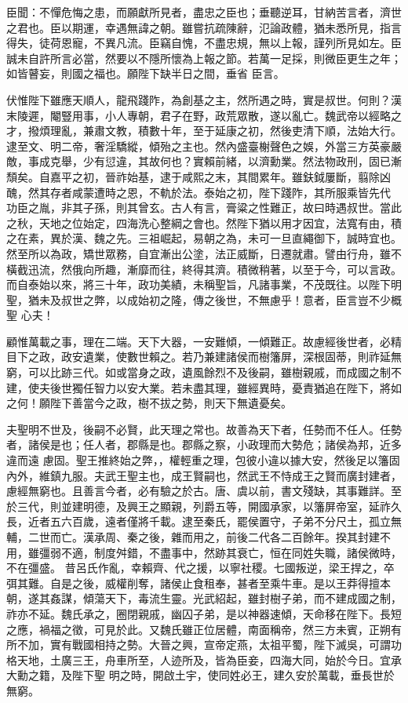 \begin{pinyinscope}
 臣聞：不憚危悔之患，而願獻所見者，盡忠之臣也；垂聽逆耳，甘納苦言者，濟世之君也。臣以期運，幸遇無諱之朝。雖嘗抗疏陳辭，氾論政體，猶未悉所見，指言得失，徒荷恩寵，不異凡流。臣竊自愧，不盡忠規，無以上報，謹列所見如左。臣誠未自許所言必當，然要以不隱所懷為上報之節。若萬一足採，則微臣更生之年；如皆瞽妄，則國之福也。願陛下缺半日之間，垂省
 臣言。



 伏惟陛下雖應天順人，龍飛踐阼，為創基之主，然所遇之時，實是叔世。何則？漢末陵遲，閹豎用事，小人專朝，君子在野，政荒眾散，遂以亂亡。魏武帝以經略之才，撥煩理亂，兼肅文教，積數十年，至于延康之初，然後吏清下順，法始大行。逮至文、明二帝，奢淫驕縱，傾殆之主也。然內盛臺榭聲色之娛，外當三方英豪嚴敵，事成克舉，少有愆違，其故何也？實賴前緒，以濟勳業。然法物政刑，固已漸頹矣。自嘉平之初，晉祚始基，逮于咸熙之末，其間累年。雖鈇鉞屢斷，翦除凶醜，然其存者咸蒙遭時之恩，不軌於法。泰始之初，陛下踐阼，其所服乘皆先代
 功臣之胤，非其子孫，則其曾玄。古人有言，膏粱之性難正，故曰時遇叔世。當此之秋，天地之位始定，四海洗心整綱之會也。然陛下猶以用才因宜，法寬有由，積之在素，異於漢、魏之先。三祖崛起，易朝之為，未可一旦直繩御下，誠時宜也。然至所以為政，矯世眾務，自宜漸出公塗，法正威斷，日遷就肅。譬由行舟，雖不橫截迅流，然俄向所趣，漸靡而往，終得其濟。積微稍著，以至于今，可以言政。而自泰始以來，將三十年，政功美績，未稱聖旨，凡諸事業，不茂既往。以陛下明聖，猶未及叔世之弊，以成始初之隆，傳之後世，不無慮乎！意者，臣言豈不少概聖
 心夫！



 顧惟萬載之事，理在二端。天下大器，一安難傾，一傾難正。故慮經後世者，必精目下之政，政安遺業，使數世賴之。若乃兼建諸侯而樹籓屏，深根固蒂，則祚延無窮，可以比跡三代。如或當身之政，遺風餘烈不及後嗣，雖樹親戚，而成國之制不建，使夫後世獨任智力以安大業。若未盡其理，雖經異時，憂責猶追在陛下，將如之何！願陛下善當今之政，樹不拔之勢，則天下無遺憂矣。



 夫聖明不世及，後嗣不必賢，此天理之常也。故善為天下者，任勢而不任人。任勢者，諸侯是也；任人者，郡縣是也。郡縣之察，小政理而大勢危；諸侯為邦，近多違而遠
 慮固。聖王推終始之弊，，權輕重之理，包彼小違以據大安，然後足以籓固內外，維鎮九服。夫武王聖主也，成王賢嗣也，然武王不恃成王之賢而廣封建者，慮經無窮也。且善言今者，必有驗之於古。唐、虞以前，書文殘缺，其事難詳。至於三代，則並建明德，及興王之顯親，列爵五等，開國承家，以籓屏帝室，延祚久長，近者五六百歲，遠者僅將千載。逮至秦氏，罷侯置守，子弟不分尺土，孤立無輔，二世而亡。漢承周、秦之後，雜而用之，前後二代各二百餘年。揆其封建不用，雖彊弱不適，制度舛錯，不盡事中，然跡其衰亡，恒在同姓失職，諸侯微時，不在彊盛。
 昔呂氏作亂，幸賴齊、代之援，以寧社稷。七國叛逆，梁王捍之，卒弭其難。自是之後，威權削奪，諸侯止食租奉，甚者至乘牛車。是以王莽得擅本朝，遂其姦謀，傾蕩天下，毒流生靈。光武紹起，雖封樹子弟，而不建成國之制，祚亦不延。魏氏承之，圈閉親戚，幽囚子弟，是以神器速傾，天命移在陛下。長短之應，禍福之徵，可見於此。又魏氏雖正位居體，南面稱帝，然三方未賓，正朔有所不加，實有戰國相持之勢。大晉之興，宣帝定燕，太祖平蜀，陛下滅吳，可謂功格天地，土廣三王，舟車所至，人迹所及，皆為臣妾，四海大同，始於今日。宜承大勳之籍，及陛下聖
 明之時，開啟土宇，使同姓必王，建久安於萬載，垂長世於無窮。




\end{pinyinscope}
